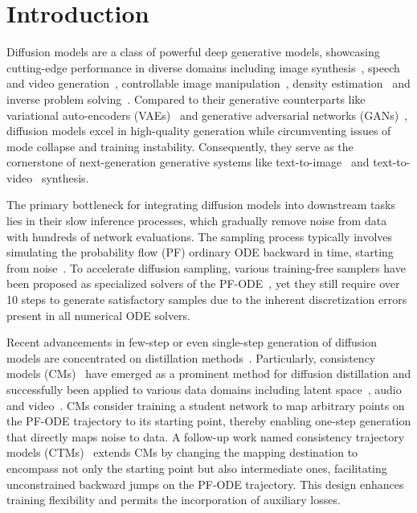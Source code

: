 \section{Introduction}
Diffusion models are a class of powerful deep generative models, showcasing cutting-edge performance in diverse domains including image synthesis~\citep{dhariwal2021diffusion,karras2022elucidating}, speech and video generation~\citep{chen2020wavegrad,ho2022imagen}, controllable image manipulation~\citep{nichol2021glide,ramesh2022hierarchical,rombach2022high,meng2021sdedit}, density estimation~\citep{song2021maximum,kingma2021variational,lu2022maximum,zheng2023improved} and inverse problem solving~\citep{chung2022diffusion,kawar2022denoising}. Compared to their 
generative counterparts like variational auto-encoders (VAEs)~\citep{kingma2013auto} and generative adversarial networks (GANs)~\citep{goodfellow2014generative}, diffusion models excel in high-quality generation while circumventing issues of mode collapse and training instability. Consequently, they serve as the cornerstone of next-generation generative systems like text-to-image~\citep{rombach2022high} and text-to-video~\citep{gupta2023photorealistic,bao2024vidu} synthesis.

The primary bottleneck for integrating diffusion models into downstream tasks lies in their slow inference processes, which gradually remove noise from data with hundreds of network evaluations. The sampling process typically involves simulating the probability flow (PF) ordinary ODE backward in time, starting from noise~\citep{song2020score}. To accelerate diffusion sampling, various training-free samplers have been proposed as specialized solvers of the PF-ODE~\citep{song2020denoising,zhang2022fast,lu2022dpm}, yet they still require over 10 steps to generate satisfactory samples due to the inherent discretization errors present in all numerical ODE solvers.

Recent advancements in few-step or even single-step generation of diffusion models are concentrated on distillation methods~\citep{luhman2021knowledge,salimans2022progressive,meng2022distillation,song2023consistency,kim2023consistency,sauer2023adversarial}. Particularly, consistency models (CMs)~\citep{song2023consistency} have emerged as a prominent method for diffusion distillation and successfully been applied to various data domains including latent space~\citep{luo2023latent}, audio~\citep{ye2023comospeech} and video~\citep{wang2023videolcm}. CMs consider training a student network to map arbitrary points on the PF-ODE trajectory to its starting point, thereby enabling one-step generation that directly maps noise to data. A follow-up work named consistency trajectory models (CTMs)~\citep{kim2023consistency} extends CMs by changing the mapping destination to encompass not only the starting point but also intermediate ones, facilitating unconstrained backward jumps on the PF-ODE trajectory. This design enhances training flexibility and permits the incorporation of auxiliary losses.

